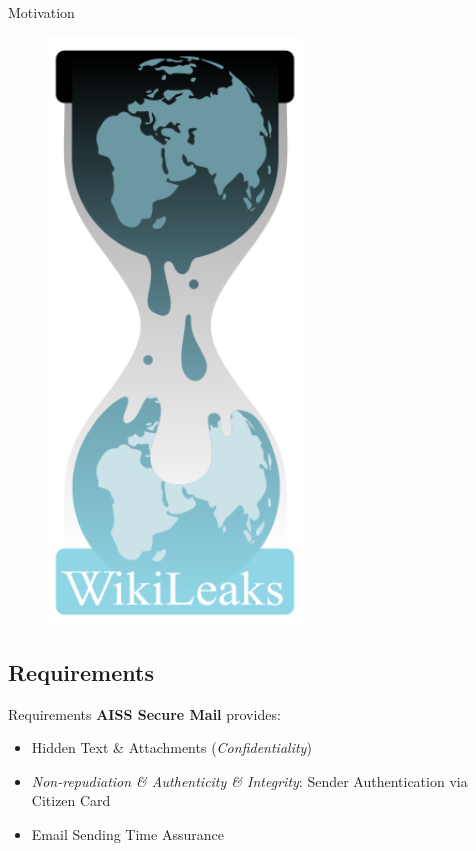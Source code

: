 \begin{frame}{Motivation}
\begin{minipage}[t]{0.7\linewidth}
\end{minipage}%
\hfill
\begin{minipage}[t]{0.3\linewidth}
 \centering
 \vspace{-1.5ex}
\begin{figure}[H]
\centering
\includegraphics[width=0.6\textwidth]{./images/wikileaks.png}
\end{figure}
\end{minipage}
   



\end{frame}


\subsection{Requirements}
\begin{frame}{Requirements}
\textbf{AISS Secure Mail}  provides: 
\begin{itemize}
\item Hidden Text \& Attachments (\textit{Confidentiality})
\item \textit{Non-repudiation \& Authenticity \& Integrity}: 
\subitem Sender Authentication via Citizen Card
\item Email Sending Time Assurance
\end{itemize}
\end{frame}

